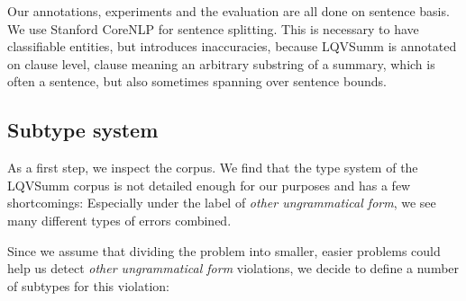\documentclass[a4paper,10pt]{scrartcl}
\theoremstyle{style}
\begin{document}
Our annotations, experiments and the evaluation are all done on sentence basis. We use Stanford CoreNLP \citep{manning-EtAl:2014:P14-5} for sentence splitting. This is necessary to have classifiable entities, but introduces inaccuracies, because LQVSumm is annotated on clause level, clause meaning an arbitrary substring of a summary, which is often a sentence, but also sometimes spanning over sentence bounds.

\subsection{Subtype system}
\label{s_subtypes}

As a first step, we inspect the corpus. We find that the type system of the LQVSumm corpus \citep{friedrichlqvsumm} is not detailed enough for our purposes and has a few shortcomings: Especially under the label of \textit{other ungrammatical form}, we see many different types of errors combined.

Since we assume that dividing the problem into smaller, easier problems could help us detect \textit{other ungrammatical form} violations, we decide to define a number of subtypes for this violation:
\end{document}

